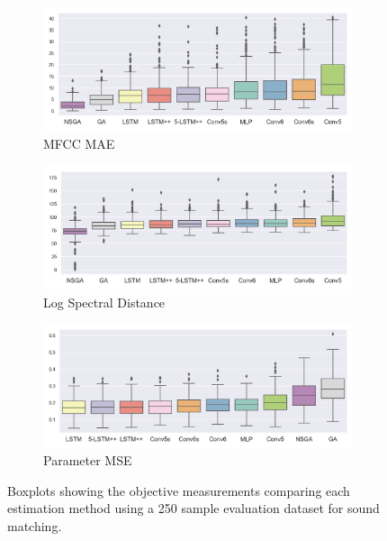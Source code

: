 \begin{figure}[p]
    \centering
    \begin{subfigure}[b]{0.99\textwidth}
        \centering
        \includegraphics[width=\textwidth]{figures/inverse-synth/mfcc_mae_boxplot.png}
        \caption{MFCC MAE}
        \label{fig:mfcc-mae}
    \end{subfigure}
    \begin{subfigure}[b]{0.99\textwidth}
        \centering
        \includegraphics[width=\textwidth]{figures/inverse-synth/lsd_boxplot.png}
        \caption{Log Spectral Distance}
        \label{fig:lsd}
    \end{subfigure}
    \begin{subfigure}[b]{0.99\textwidth}
        \centering
        \includegraphics[width=\textwidth]{figures/inverse-synth/parameter_boxplot.png}
        \caption{Parameter MSE}
        \label{fig:param-mse}
    \end{subfigure}
    \caption{Boxplots showing the objective measurements comparing each estimation method using a 250 sample evaluation dataset for sound matching.}
    \label{fig:eval-boxplot}
\end{figure}

